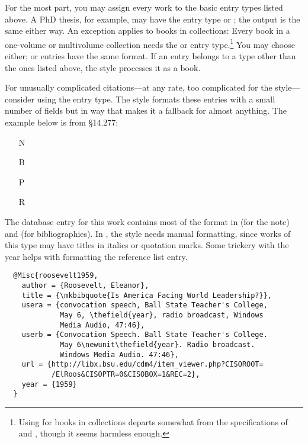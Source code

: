 \documentclass[11pt,letterpaper,oneside]{article}
\begin{document}
\noindent For the most part, you may assign every work to the basic
entry types listed above. A PhD thesis, for example, may have the
entry type  or ; the output is the
same either way. An exception applies to books in collections: Every
book in a one-volume or multivolume collection needs the
 or  entry type.\footnote{Using
 for books in collections departs somewhat from the
specifications of \BibTeX and \biblatex, though it seems harmless
enough.} You may choose either;  or
 entries have the same format. If an entry belongs
to a type other than the ones listed above, the style processes it as
a book.

For unusually complicated ci\-ta\-tions---at any rate, too complicated
for the style---consider using the  entry type. The
style formats these entries with a small number of fields but in way
that makes it a fallback for almost anything. The example below is
from \S14.277:

\begin{itemize}
\item[N] 

\item[B] 

\item[P] 

\item[R] 
\end{itemize}

\noindent The database entry for this work contains most of the format
in  (for the note) and  (for
bibliographies). In , the style needs manual
formatting, since works of this type may have titles in italics or
quotation marks. Some trickery with the year helps with formatting the
reference list entry.

\begin{lstlisting}
  @Misc{roosevelt1959,
    author = {Roosevelt, Eleanor},
    title = {\mkbibquote{Is America Facing World Leadership?}},
    usera = {convocation speech, Ball State Teacher's College,
             May 6, \thefield{year}, radio broadcast, Windows
             Media Audio, 47:46},
    userb = {Convocation Speech. Ball State Teacher's College.
             May 6\newunit\thefield{year}. Radio broadcast.
             Windows Media Audio. 47:46},
    url = {http://libx.bsu.edu/cdm4/item_viewer.php?CISOROOT=
           /ElRoos&CISOPTR=0&CISOBOX=1&REC=2},
    year = {1959}
  }
\end{lstlisting}
\end{document}
